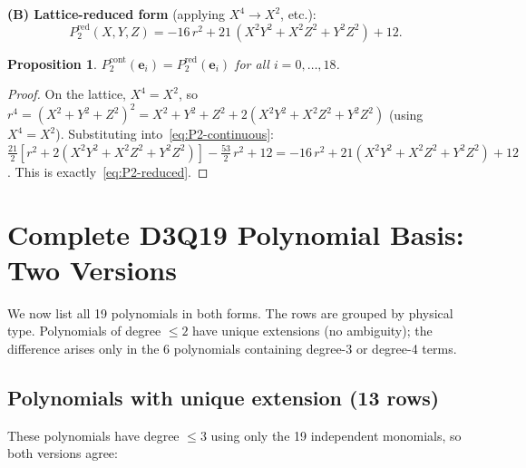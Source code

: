 \documentclass[11pt,a4paper]{article}
\newtheorem{proposition}{Proposition}[section]
\newcommand{\vect}[1]{\bm{#1}}
\begin{document}
\noindent\textbf{(B) Lattice-reduced form} (applying $X^4 \to X^2$, etc.):
\begin{equation}\label{eq:P2-reduced}
  P_2^{\text{red}}(X,Y,Z) = -16\,r^2 + 21\,(X^2 Y^2 + X^2 Z^2 + Y^2 Z^2) + 12.
\end{equation}

\begin{proposition}\label{prop:equiv-on-lattice}
$P_2^{\text{cont}}(\vect{e}_i) = P_2^{\text{red}}(\vect{e}_i)$ for all $i = 0,\ldots,18$.
\end{proposition}
\begin{proof}
On the lattice, $X^4 = X^2$, so $r^4 = (X^2+Y^2+Z^2)^2 = X^2 + Y^2 + Z^2 + 2(X^2 Y^2 + X^2 Z^2 + Y^2 Z^2)$ (using $X^4 = X^2$).
Substituting into~\eqref{eq:P2-continuous}:
$\frac{21}{2}[r^2 + 2(X^2 Y^2 + X^2 Z^2 + Y^2 Z^2)] - \frac{53}{2}\,r^2 + 12 = -16\,r^2 + 21(X^2 Y^2 + X^2 Z^2 + Y^2 Z^2) + 12$.
This is exactly~\eqref{eq:P2-reduced}.
\end{proof}

\section{Complete D3Q19 Polynomial Basis: Two Versions}\label{sec:polys}

We now list all 19 polynomials in both forms.
The rows are grouped by physical type.
Polynomials of degree $\leq 2$ have unique extensions (no ambiguity); the difference arises only in the 6 polynomials containing degree-3 or degree-4 terms.

\subsection{Polynomials with unique extension (13 rows)}

These polynomials have degree $\leq 3$ using only the 19 independent monomials, so both versions agree:
\end{document}
